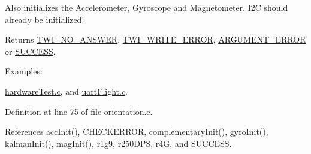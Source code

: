 Also initializes the Accelerometer, Gyroscope and Magnetometer. I2\-C should already be initialized! \begin{DoxyReturn}{Returns}
\hyperlink{group__error_gga2c3e4bb40f36b262a5214e2da2bca9c5a04d5943ba652af2205c88b247e0c659c}{T\-W\-I\-\_\-\-N\-O\-\_\-\-A\-N\-S\-W\-E\-R}, \hyperlink{group__error_gga2c3e4bb40f36b262a5214e2da2bca9c5ac0e3b3463dcaf220e54794b4711708c9}{T\-W\-I\-\_\-\-W\-R\-I\-T\-E\-\_\-\-E\-R\-R\-O\-R}, \hyperlink{group__error_gga2c3e4bb40f36b262a5214e2da2bca9c5a49ccf277a69dd938c591928aa27c66cc}{A\-R\-G\-U\-M\-E\-N\-T\-\_\-\-E\-R\-R\-O\-R} or \hyperlink{group__error_gga2c3e4bb40f36b262a5214e2da2bca9c5ac7f69f7c9e5aea9b8f54cf02870e2bf8}{S\-U\-C\-C\-E\-S\-S}. 
\end{DoxyReturn}
\begin{Desc}
\item[Examples\-: ]\par
\hyperlink{hardware_test_8c-example}{hardware\-Test.\-c}, and \hyperlink{uart_flight_8c-example}{uart\-Flight.\-c}.\end{Desc}


Definition at line 75 of file orientation.\-c.



References acc\-Init(), C\-H\-E\-C\-K\-E\-R\-R\-O\-R, complementary\-Init(), gyro\-Init(), kalman\-Init(), mag\-Init(), r1g9, r250\-D\-P\-S, r4\-G, and S\-U\-C\-C\-E\-S\-S.


